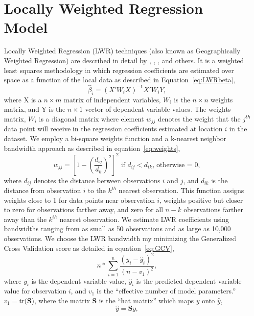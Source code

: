 \documentclass{article}\usepackage{graphicx, color}
\begin{document}
\section{Locally Weighted Regression Model}
Locally Weighted Regression (LWR) techniques (also known as Geographically Weighted Regression) are described in detail by \citet{Cleveland1988}, \citet{Brunsdon1998b}, \citet{Fotheringham2002}, and others. It is a weighted least squares methodology in which regression coefficients are estimated over space as a function of the local data as described in Equation~\eqref{eq:LWRbeta},
\begin{equation}\label{eq:LWRbeta}
\hat{\beta}_i = (X'W_iX)^{-1}X'W_iY,
\end{equation}
where X is a $n \times m$ matrix of independent variables, $W_i$ is the $n \times n$ weights matrix, and Y is the $n \times 1$ vector of dependent variable values. The weights matrix, $W_i$ is a diagonal matrix where element $w_{jj}$ denotes the weight that the $j^{th}$ data point will receive in the regression coefficients estimated at location $i$ in the dataset. We employ a bi-square weights function and a k-nearest neighbor bandwidth approach as described in equation~\eqref{eq:weights}, 
\begin{equation}\label{eq:weights}
w_{jj}=\left[1-\left(\frac{d_{ij}}{d_{k}}\right)^2 \right]^2 \textrm{ if  }d_{ij}<d_{ik}\textrm{, otherwise = 0},
\end{equation}
where $d_{ij}$ denotes the distance between observations $i$ and $j$, and $d_{ik}$ is the distance from observation $i$ to the $k^{th}$ nearest observation. This function assigns weights close to 1 for data points near observation $i$, weights positive but closer to zero for observations farther away, and zero for all $n-k$ observations farther away than the $k^{th}$ nearest observation. 
We estimate LWR coefficients using bandwidths ranging from as small as 50 observations and as large as 10,000 observations. We choose the LWR bandwidth my minimizing the Generalized Cross Validation score as detailed in equation~\eqref{eq:GCV},
\begin{equation}\label{eq:GCV}
n*\sum_{i=1}^{n}\frac{(y_i-\hat{y}_i)^2}{(n-v_1)^2}, 
\end{equation} 
where $y_i$ is the dependent variable value, $\hat{y}_i$ is the predicted dependent variable value for observation $i$, and $v_1$ is the ``effective number of model parameters.''
$v_1=$tr(\textbf{S}), where the matrix \textbf{S} is the ``hat matrix'' which maps $y$ onto $\hat{y}$,
                   \begin{equation*}
                   \hat{y}=\textbf{S}y,
                   \end{equation*}
\end{document}
